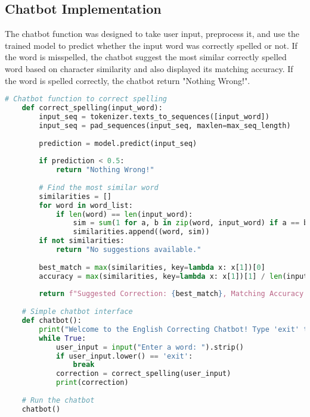 \subsection{Chatbot Implementation}
The chatbot function was designed to take user input, preprocess it, and use the trained model to predict whether the input word was correctly spelled or not. If the word is misspelled, the chatbot suggest the most similar correctly spelled word based on character similarity and also displayed its matching accuracy. If the word is spelled correctly, the chatbot return "Nothing Wrong!".
\begin{lstlisting}[language=Python, caption=Data Collection and Preprocessing]
    # Chatbot function to correct spelling
    def correct_spelling(input_word):
        input_seq = tokenizer.texts_to_sequences([input_word])
        input_seq = pad_sequences(input_seq, maxlen=max_seq_length)
        
        prediction = model.predict(input_seq)
        
        if prediction < 0.5:
            return "Nothing Wrong!"
        
        # Find the most similar word
        similarities = []
        for word in word_list:
            if len(word) == len(input_word):
                sim = sum(1 for a, b in zip(word, input_word) if a == b)
                similarities.append((word, sim))
        if not similarities:
            return "No suggestions available."
        
        best_match = max(similarities, key=lambda x: x[1])[0]
        accuracy = max(similarities, key=lambda x: x[1])[1] / len(input_word) * 100
        
        return f"Suggested Correction: {best_match}, Matching Accuracy: {accuracy:.2f}%"
    
    # Simple chatbot interface
    def chatbot():
        print("Welcome to the English Correcting Chatbot! Type 'exit' to quit.")
        while True:
            user_input = input("Enter a word: ").strip()
            if user_input.lower() == 'exit':
                break
            correction = correct_spelling(user_input)
            print(correction)
    
    # Run the chatbot
    chatbot()
    
\end{lstlisting}

